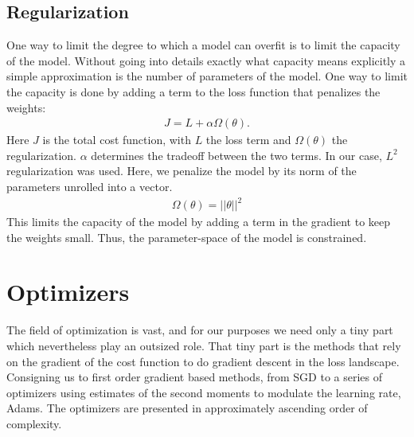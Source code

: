\subsection{Regularization}
\label{subsec:regop}
One way to limit the degree to which a model can overfit is to limit the capacity of the model.
Without going into details exactly what capacity means explicitly a simple approximation is the number of parameters of the model.
One way to limit the capacity is done by adding a term to the loss function that penalizes the weights:
\begin{align}
	J = L + \alpha \Omega(\theta).
\end{align}
Here $J$ is the total cost function, with $L$ the loss term and $\Omega(\theta)$ the regularization.
$\alpha$ determines the tradeoff between the two terms. In our case, $L^2$ regularization was used. Here, we penalize the model by its norm of the parameters unrolled into a vector.
\begin{align}
	\Omega(\theta) = ||\theta||^2
\end{align}
This limits the capacity of the model by adding a term in the gradient to keep the weights small. 
Thus, the parameter-space of the model is constrained.
\section{Optimizers}
\label{sec:optimizers}
The field of optimization is vast, and for our purposes we need only a tiny part which nevertheless play an outsized role. 
That tiny part is the methods that rely on the gradient of the cost function to do gradient descent in the loss landscape.
Consigning us to first order gradient based methods, from \acf{SGD} to a series of optimizers using estimates of the second moments to modulate the learning rate, \acp{Adam}. 
The optimizers are presented in approximately ascending order of complexity. 

